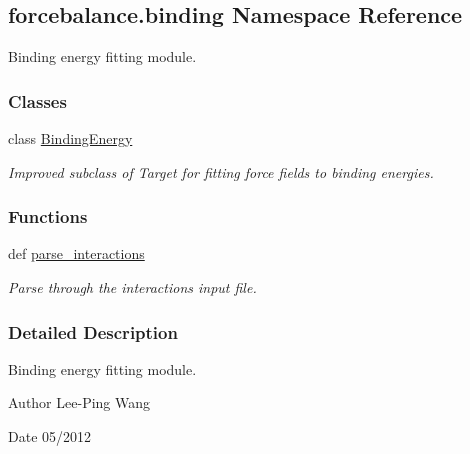 \hypertarget{namespaceforcebalance_1_1binding}{\subsection{forcebalance.\-binding Namespace Reference}
\label{namespaceforcebalance_1_1binding}
}


Binding energy fitting module.  


\subsubsection*{Classes}
\begin{DoxyCompactItemize}
\item 
class \hyperlink{classforcebalance_1_1binding_1_1BindingEnergy}{Binding\-Energy}
\begin{DoxyCompactList}\small\item\em Improved subclass of Target for fitting force fields to binding energies. \end{DoxyCompactList}\end{DoxyCompactItemize}
\subsubsection*{Functions}
\begin{DoxyCompactItemize}
\item 
def \hyperlink{namespaceforcebalance_1_1binding_a0ae2f9f7a4ab7f4c64f8826de52331e9}{parse\-\_\-interactions}
\begin{DoxyCompactList}\small\item\em Parse through the interactions input file. \end{DoxyCompactList}\end{DoxyCompactItemize}


\subsubsection{Detailed Description}
Binding energy fitting module. \begin{DoxyAuthor}{Author}
Lee-\/\-Ping Wang 
\end{DoxyAuthor}
\begin{DoxyDate}{Date}
05/2012 
\end{DoxyDate}


